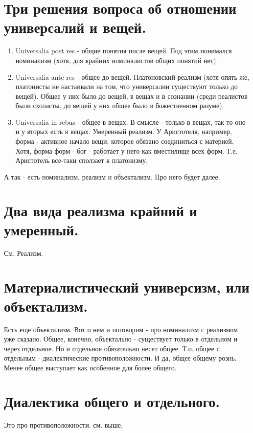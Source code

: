 \section{ Три решения вопроса об отношении универсалий и вещей.}
\begin{enumerate}
\item Universalia post res - общие понятия после вещей. Под этим понимался номинализм (хотя, для крайних номиналистов общих понятий нет).
\item Universalia ante res - общее до вещей. Платоновский реализм (хотя опять же, платонисты не настаивали на том, что универсалии существуют только до вещей). Общее у них было до вещей, в вещах и в сознании (среди реалистов были схоласты, до вещей у них общее было в божественном разуме).
\item Universalia in rebus - общее в вещах. В смысле - только в вещах, так-то оно и у вторых есть в вещах. Умеренный реализм. У Аристотеля, например, форма - активное начало вещи, которое обязано соединиться с материей. Хотя, форма форм - бог - работает у него как вместилище всех форм. Т.е. Аристотель все-таки сползает к платонизму.
\end{enumerate}
А так - есть номинализм, реализм и объектализм. Про него будет далее.

\section{ Два вида реализма крайний и умеренный.}
См. Реализм.

\section{ Материалистический универсизм, или объектализм.}
Есть еще объектализм. Вот о нем и поговорим - про номинализм с реализмом уже сказано. Общее, конечно, объектально - существует только в отдельном и через отдельное. Но и отдельное обязательно несет общее. Т.о. общее с отдельным - диалектические противоположности. И да, общее общему рознь. Менее общее выступает как особенное для более общего.

\section{ Диалектика общего и отдельного.}
Это про противоположности. см. выше.

